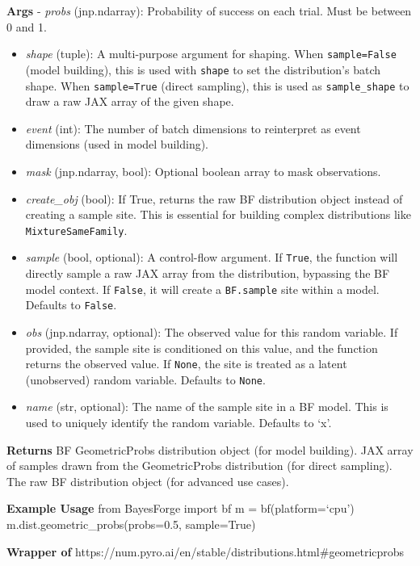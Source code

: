 \documentclass[
  letterpaper,
  DIV=11,
  numbers=noendperiod]{scrartcl}
\begin{document}
\textbf{Args} - \emph{probs} (jnp.ndarray): Probability of success on
each trial. Must be between 0 and 1.

\begin{itemize}
\item
  \emph{shape} (tuple): A multi-purpose argument for shaping. When
  \texttt{sample=False} (model building), this is used with
  \texttt{shape} to set the distribution's batch shape. When
  \texttt{sample=True} (direct sampling), this is used as
  \texttt{sample\_shape} to draw a raw JAX array of the given shape.
\item
  \emph{event} (int): The number of batch dimensions to reinterpret as
  event dimensions (used in model building).
\item
  \emph{mask} (jnp.ndarray, bool): Optional boolean array to mask
  observations.
\item
  \emph{create\_obj} (bool): If True, returns the raw BF distribution
  object instead of creating a sample site. This is essential for
  building complex distributions like \texttt{MixtureSameFamily}.
\item
  \emph{sample} (bool, optional): A control-flow argument. If
  \texttt{True}, the function will directly sample a raw JAX array from
  the distribution, bypassing the BF model context. If \texttt{False},
  it will create a \texttt{BF.sample} site within a model. Defaults to
  \texttt{False}.
\item
  \emph{obs} (jnp.ndarray, optional): The observed value for this random
  variable. If provided, the sample site is conditioned on this value,
  and the function returns the observed value. If \texttt{None}, the
  site is treated as a latent (unobserved) random variable. Defaults to
  \texttt{None}.
\item
  \emph{name} (str, optional): The name of the sample site in a BF
  model. This is used to uniquely identify the random variable. Defaults
  to `x'.
\end{itemize}

\textbf{Returns} BF GeometricProbs distribution object (for model
building). JAX array of samples drawn from the GeometricProbs
distribution (for direct sampling). The raw BF distribution object (for
advanced use cases).

\textbf{Example Usage} from BayesForge import bf m = bf(platform=`cpu')
m.dist.geometric\_probs(probs=0.5, sample=True)

\textbf{Wrapper of}
https://num.pyro.ai/en/stable/distributions.html\#geometricprobs
\end{document}
